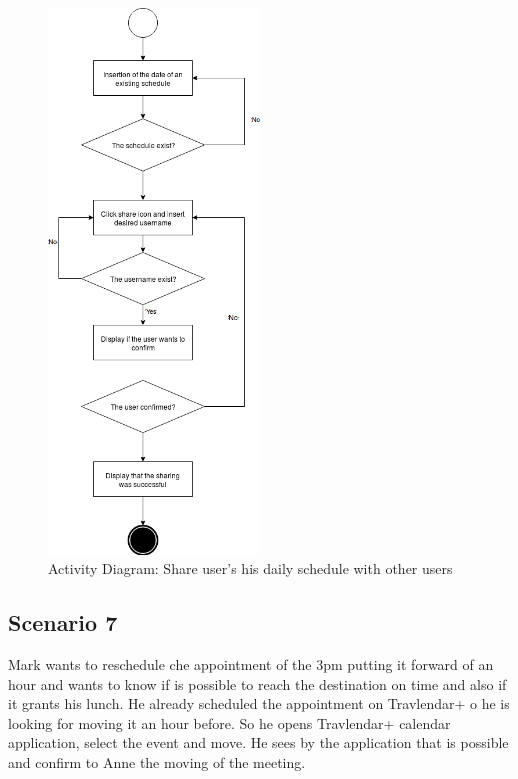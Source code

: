 \documentclass[numbers=noenddot, 12pt, a4paper, oneside]{scrbook}
\begin{document}
\begin{figure}[H]
	\centering
	\includegraphics[width=0.5\textwidth]{flows/Scenario6}
	\caption{Activity Diagram: Share user's his daily schedule with other users}
\end{figure}
\newpage

\subsection*{Scenario 7}

Mark wants to reschedule che appointment of the 3pm putting it forward of an hour and wants to know if is possible to reach the destination on time and also if it grants his lunch. He already scheduled the appointment on Travlendar+ o he is looking for moving it an hour before.
So he opens Travlendar+ calendar application, select the event and move.
He sees by the application that is possible and confirm to Anne the moving of the meeting.
\\
\end{document}
